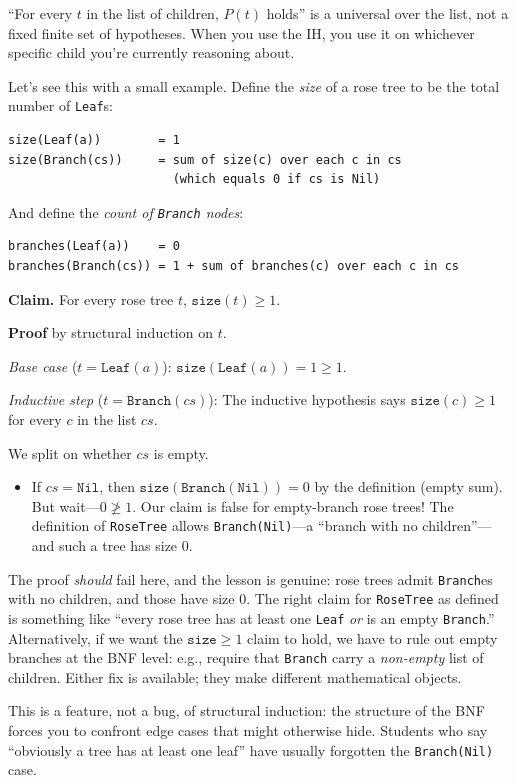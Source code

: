 \documentclass[11pt]{article}
\begin{document}
``For every $t$ in the list of children, $P(t)$ holds'' is a universal over the list, not a fixed finite set of hypotheses. When you use the IH, you use it on whichever specific child you're currently reasoning about.

Let's see this with a small example. Define the \emph{size} of a rose tree to be the total number of \texttt{Leaf}s:
\begin{lstlisting}
size(Leaf(a))        = 1
size(Branch(cs))     = sum of size(c) over each c in cs
                       (which equals 0 if cs is Nil)
\end{lstlisting}
And define the \emph{count of \texttt{Branch} nodes}:
\begin{lstlisting}
branches(Leaf(a))    = 0
branches(Branch(cs)) = 1 + sum of branches(c) over each c in cs
\end{lstlisting}

\textbf{Claim.} For every rose tree $t$, $\texttt{size}(t) \geq 1$.

\textbf{Proof} by structural induction on $t$.

\emph{Base case} ($t = \texttt{Leaf}(a)$): $\texttt{size}(\texttt{Leaf}(a)) = 1 \geq 1$. \checkmark

\emph{Inductive step} ($t = \texttt{Branch}(cs)$): The inductive hypothesis says $\texttt{size}(c) \geq 1$ for every $c$ in the list $cs$.

We split on whether $cs$ is empty.
\begin{itemize}
  \item If $cs = \texttt{Nil}$, then $\texttt{size}(\texttt{Branch}(\texttt{Nil})) = 0$ by the definition (empty sum). But wait---$0 \not\geq 1$. Our claim is false for empty-branch rose trees! The definition of \texttt{RoseTree} allows \texttt{Branch(Nil)}---a ``branch with no children''---and such a tree has size $0$.
\end{itemize}

The proof \emph{should} fail here, and the lesson is genuine: rose trees admit \texttt{Branch}es with no children, and those have size $0$. The right claim for \texttt{RoseTree} as defined is something like ``every rose tree has at least one \texttt{Leaf} \emph{or} is an empty \texttt{Branch}.'' Alternatively, if we want the $\texttt{size} \geq 1$ claim to hold, we have to rule out empty branches at the BNF level: e.g., require that \texttt{Branch} carry a \emph{non-empty} list of children. Either fix is available; they make different mathematical objects.

This is a feature, not a bug, of structural induction: the structure of the BNF forces you to confront edge cases that might otherwise hide. Students who say ``obviously a tree has at least one leaf'' have usually forgotten the \texttt{Branch(Nil)} case.
\end{document}
